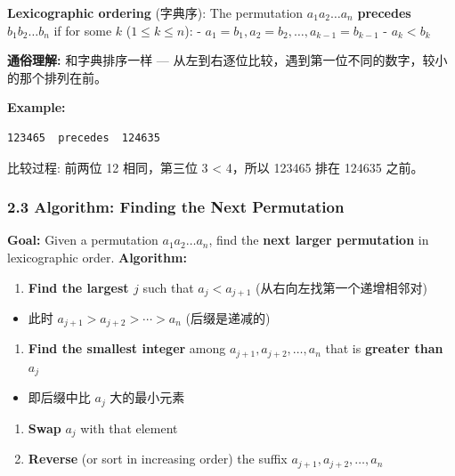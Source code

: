 \documentclass[10pt,a4paper,openany]{ctexbook}
\theoremstyle{definition}
\theoremstyle{remark}
\renewenvironment{quote}
  {\list{}{\leftmargin=1em\rightmargin=0pt\topsep=0.5pt\partopsep=0pt}\item[]}
  {\endlist}
\begin{document}
\begin{quote}
\textbf{Lexicographic ordering} (字典序): The permutation $a_1 a_2 \ldots a_n$ \textbf{precedes} $b_1 b_2 \ldots b_n$ if for some $k$ ($1 \le k \le n$):
- $a_1 = b_1, a_2 = b_2, \ldots, a_{k-1} = b_{k-1}$
- $a_k < b_k$

\textbf{通俗理解:} 和字典排序一样 — 从左到右逐位比较，遇到第一位不同的数字，较小的那个排列在前。

\textbf{Example:}
{\footnotesize\begin{verbatim}
123465  precedes  124635
\end{verbatim}}

比较过程: 前两位 12 相同，第三位 3 < 4，所以 123465 排在 124635 之前。

\end{quote}

\subsubsection{2.3 Algorithm: Finding the Next Permutation}

\textbf{Goal:} Given a permutation $a_1 a_2 \ldots a_n$, find the \textbf{next larger permutation} in lexicographic order.
\textbf{Algorithm:}
\begin{enumerate}
\item \textbf{Find the largest $j$} such that $a_j < a_{j+1}$  (从右向左找第一个递增相邻对)
\end{enumerate}

\begin{itemize}
\item 此时 $a_{j+1} > a_{j+2} > \cdots > a_n$ (后缀是递减的)

\end{itemize}

\begin{enumerate}
\item \textbf{Find the smallest integer} among $a_{j+1}, a_{j+2}, \ldots, a_n$ that is \textbf{greater than} $a_j$
\end{enumerate}

\begin{itemize}
\item 即后缀中比 $a_j$ 大的最小元素

\end{itemize}

\begin{enumerate}
\item \textbf{Swap} $a_j$ with that element

\item \textbf{Reverse} (or sort in increasing order) the suffix $a_{j+1}, a_{j+2}, \ldots, a_n$

\end{enumerate}
\end{document}
